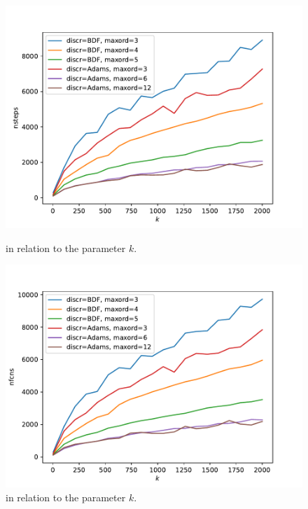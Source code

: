 \documentclass{scrartcl}
\begin{document}
\begin{figure}[h]
\centering
\begin{minipage}[b]{0.45\textwidth}
\centering
\includegraphics[width=\textwidth]{../Plots/Task4/Figure_200}
\caption{ in relation to the parameter $k$.}
\label{pl:nsteps1}
\end{minipage}
\hfill
\begin{minipage}[b]{0.45\textwidth}
\centering
\includegraphics[width=\textwidth]{../Plots/Task4/Figure_201}
\caption{ in relation to the parameter $k$.}
\label{pl:nfcns1}
\end{minipage}
\end{figure}
\end{document}

